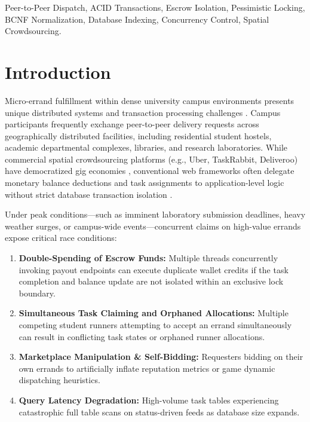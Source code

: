 \documentclass[conference]{IEEEtran}
\begin{document}
\begin{IEEEkeywords}
Peer-to-Peer Dispatch, ACID Transactions, Escrow Isolation, Pessimistic Locking, BCNF Normalization, Database Indexing, Concurrency Control, Spatial Crowdsourcing.
\end{IEEEkeywords}

\section{Introduction}
Micro-errand fulfillment within dense university campus environments presents unique distributed systems and transaction processing challenges \cite{gray1992transaction,tong2020spatial}. Campus participants frequently exchange peer-to-peer delivery requests across geographically distributed facilities, including residential student hostels, academic departmental complexes, libraries, and research laboratories. While commercial spatial crowdsourcing platforms (e.g., Uber, TaskRabbit, Deliveroo) have democratized gig economies \cite{chen2019ridesharing,kazemi2012geotruncation}, conventional web frameworks often delegate monetary balance deductions and task assignments to application-level logic without strict database transaction isolation \cite{bailis2014acid}. 

Under peak conditions---such as imminent laboratory submission deadlines, heavy weather surges, or campus-wide events---concurrent claims on high-value errands expose critical race conditions:
\begin{enumerate}
    \item \textbf{Double-Spending of Escrow Funds:} Multiple threads concurrently invoking payout endpoints can execute duplicate wallet credits if the task completion and balance update are not isolated within an exclusive lock boundary.
    \item \textbf{Simultaneous Task Claiming and Orphaned Allocations:} Multiple competing student runners attempting to accept an errand simultaneously can result in conflicting task states or orphaned runner allocations.
    \item \textbf{Marketplace Manipulation \& Self-Bidding:} Requesters bidding on their own errands to artificially inflate reputation metrics or game dynamic dispatching heuristics.
    \item \textbf{Query Latency Degradation:} High-volume task tables experiencing catastrophic full table scans on status-driven feeds as database size expands.
\end{enumerate}
\end{document}
